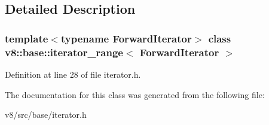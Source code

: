 \subsection{Detailed Description}
\subsubsection*{template$<$typename Forward\+Iterator$>$\newline
class v8\+::base\+::iterator\+\_\+range$<$ Forward\+Iterator $>$}



Definition at line 28 of file iterator.\+h.



The documentation for this class was generated from the following file\+:\begin{DoxyCompactItemize}
\item 
v8/src/base/iterator.\+h\end{DoxyCompactItemize}
